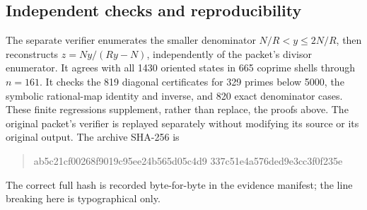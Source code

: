 \subsection{Independent checks and reproducibility}

The separate verifier
enumerates the smaller denominator $N/R<y\le2N/R$, then reconstructs
$z=Ny/(Ry-N)$, independently of the packet's divisor enumerator. It agrees
with all 1430 oriented states in 665 coprime shells through $n=161$.
It checks the 819 diagonal certificates for 329 primes below 5000, the
symbolic rational-map identity and inverse, and 820 exact denominator cases.
These finite regressions supplement, rather than replace, the proofs above.
The original packet's verifier is replayed separately without modifying its
source or its original output. The archive SHA-256 is
\begin{quote}\small\ttfamily
ab5c21cf00268f9019c95ee24b565d05c4d9\allowbreak
337c51e4a576ded9e3cc3f0f235e
\end{quote}
The correct full hash is recorded byte-for-byte in the evidence manifest;
the line breaking here is typographical only.
